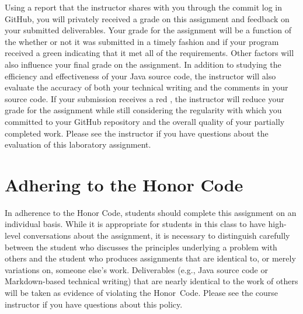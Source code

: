 \documentclass[11pt]{article}
\newcommand{\checkmark}{\ding{51}}
\newcommand{\naughtmark}{\ding{55}}
\begin{document}
Using a report that the instructor shares with you through the commit log in
GitHub, you will privately received a grade on this assignment and feedback on
your submitted deliverables. Your grade for the assignment will be a function of
the whether or not it was submitted in a timely fashion and if your program
received a green \checkmark{} indicating that it met all of the requirements.
Other factors will also influence your final grade on the assignment. In
addition to studying the efficiency and effectiveness of your Java source code,
the instructor will also evaluate the accuracy of both your technical writing
and the comments in your source code. If your submission receives a red
\naughtmark{}, the instructor will reduce your grade for the assignment while
still considering the regularity with which you committed to your GitHub
repository and the overall quality of your partially completed work. Please see
the instructor if you have questions about the evaluation of this laboratory
assignment.

\section*{Adhering to the Honor Code}

In adherence to the Honor Code, students should complete this assignment on an
individual basis. While it is appropriate for students in this class to have
high-level conversations about the assignment, it is necessary to distinguish
carefully between the student who discusses the principles underlying a problem
with others and the student who produces assignments that are identical to, or
merely variations on, someone else's work. Deliverables (e.g., Java source code
or Markdown-based technical writing) that are nearly identical to the work of
others will be taken as evidence of violating the \mbox{Honor Code}. Please see
the course instructor if you have questions about this policy.
\end{document}

